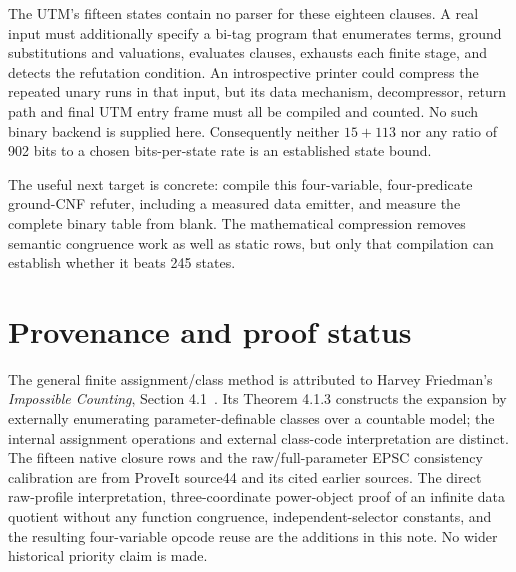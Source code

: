\documentclass[11pt]{article}
\begin{document}
The UTM's fifteen states contain no parser for these eighteen clauses.
A real input must additionally specify a bi-tag program that enumerates
terms, ground substitutions and valuations, evaluates clauses, exhausts
each finite stage, and detects the refutation condition. An introspective
printer could compress the repeated unary runs in that input, but its
data mechanism, decompressor, return path and final UTM entry frame must
all be compiled and counted. No such binary backend is supplied here.
Consequently neither $15+113$ nor any ratio of 902 bits to a chosen
bits-per-state rate is an established state bound.

The useful next target is concrete: compile this four-variable,
four-predicate ground-CNF refuter, including a measured data emitter,
and measure the complete binary table from blank. The mathematical
compression removes semantic congruence work as well as static rows,
but only that compilation can establish whether it beats 245 states.

\section{Provenance and proof status}

The general finite assignment/class method is attributed to Harvey
Friedman's \emph{Impossible Counting}, Section 4.1~\cite{friedman2017}.
Its Theorem 4.1.3 constructs the expansion by externally enumerating
parameter-definable classes over a countable model; the internal
assignment operations and external class-code interpretation are distinct.
The fifteen native
closure rows and the raw/full-parameter EPSC consistency calibration are
from ProveIt source44 and its cited earlier sources. The direct
raw-profile interpretation, three-coordinate power-object proof of an
infinite data quotient without any function congruence,
independent-selector constants, and the resulting four-variable
opcode reuse are the additions in this note. No wider historical priority
claim is made.
\end{document}
